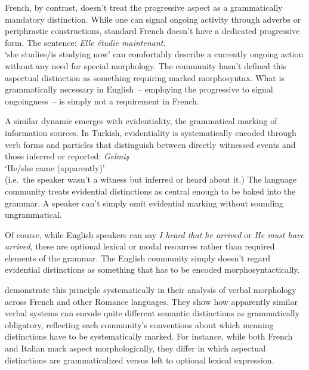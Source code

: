 \documentclass[12pt,letterpaper]{article}
\newcommand{\mention}[1]{\textit{#1}}
\newcommand{\olang}[1]{\textit{#1}}
\begin{document}
French, by contrast, doesn't treat the progressive aspect as a grammatically mandatory distinction. While one can signal ongoing activity through adverbs or periphrastic constructions, standard French doesn't have a dedicated progressive form. The sentence:
\ea
\olang{Elle étudie maintenant.}\\
`she studies/is studying now'
\z
can comfortably describe a currently ongoing action without any need for special morphology. The community hasn't defined this aspectual distinction as something requiring marked morphosyntax. What is grammatically necessary in English~--  employing the progressive to signal ongoingness~--  is simply not a requirement in French.

A similar dynamic emerges with evidentiality, the grammatical marking of information sources. In Turkish, evidentiality is systematically encoded through verb forms and particles that distinguish between directly witnessed events and those inferred or reported:
\ea
\textit{Gelmiş}\\
`He/she came (apparently)' \\(i.e.\, the speaker wasn't a witness but inferred or heard about it.)
\z
The language community treats evidential distinctions as central enough to be baked into the grammar. A speaker can't simply omit evidential marking without sounding ungrammatical.

Of course, while English speakers can say \mention{I heard that he arrived} or \mention{He must have arrived}, these are optional lexical or modal resources rather than required elements of the grammar. The English community simply doesn't regard evidential distinctions as something that has to be encoded morphosyntactically.

\textcite{kilani2005} demonstrate this principle systematically in their analysis of verbal morphology across French and other Romance languages. They show how apparently similar verbal systems can encode quite different semantic distinctions as grammatically obligatory, reflecting each community's conventions about which meaning distinctions have to be systematically marked. For instance, while both French and Italian mark aspect morphologically, they differ in which aspectual distinctions are grammaticalized versus left to optional lexical expression.
\end{document}
